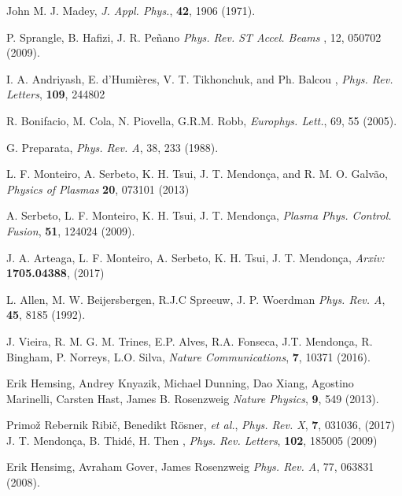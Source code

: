 \documentclass[aps,pra,preprint,showpacs,preprintnumbers,amsmath,amssymb]{revtex4-1}
\begin{document}
\begin{thebibliography}{99}

John M. J. Madey, {\sl J. Appl. Phys.}, {\bf 42}, 1906 (1971).

P. Sprangle, B. Hafizi, J. R. Peñano {\sl Phys. Rev. ST Accel. Beams }, {12}, 050702 (2009).

I. A. Andriyash, E. d’Humières, V. T. Tikhonchuk, and Ph. Balcou
, {\sl Phys. Rev. Letters}, {\bf 109}, {244802}

R. Bonifacio, M. Cola, N. Piovella, G.R.M. Robb,
{\sl Europhys. Lett.}, 69, 55 (2005).

G. Preparata, {\sl Phys. Rev. A},  38, 233 (1988).



L. F. Monteiro, A. Serbeto, K. H. Tsui, J. T. Mendon\c{c}a, and R. M. O. Galv\~{a}o, {\sl Physics of Plasmas} {\bf 20}, 073101 (2013)

A. Serbeto, L. F. Monteiro, K. H. Tsui, J. T. Mendon\c{c}a, {\sl Plasma Phys. Control. Fusion}, {\bf 51}, 124024 (2009).

J. A. Arteaga, L. F. Monteiro, A. Serbeto, K. H. Tsui, J. T. Mendon\c{c}a, {\sl Arxiv:} {\bf 1705.04388}, (2017) 

L. Allen, M. W. Beijersbergen, R.J.C Spreeuw, J. P. Woerdman  {\sl Phys. Rev. A}, {\bf 45}, 8185 (1992).

J. Vieira, R. M. G. M. Trines, E.P. Alves, R.A. Fonseca, J.T. Mendon\c{c}a, R. Bingham, P. Norreys, L.O. Silva, {\sl Nature Communications}, {\bf 7}, 10371 (2016).




Erik Hemsing, Andrey Knyazik, Michael Dunning, Dao Xiang, Agostino Marinelli, Carsten Hast, James  B. Rosenzweig {\sl Nature Physics}, {\bf 9}, 549 (2013).



Primo\v{z} Rebernik Ribi\v{c}, Benedikt R\"{o}sner, \textit{et al.}, {\sl Phys. Rev. X}, {\bf 7}, {031036}, (2017)
J. T. Mendon\c{c}a, B. Thidé, H. Then , {\sl Phys. Rev. Letters}, {\bf 102}, 185005 (2009)


Erik Hensimg, Avraham Gover, James Rosenzweig {\sl Phys. Rev. A}, {77}, 063831 (2008).








\end{thebibliography}
\end{document}
